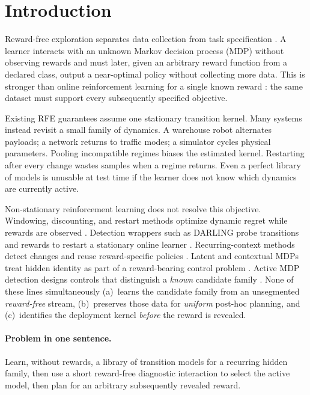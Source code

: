 \documentclass[11pt]{article}
\begin{document}
\section{Introduction}
\label{sec:intro}

Reward-free exploration separates data collection from task specification
\citep{jin2020rewardfree,kaufmann2021adaptive,zhang2021nearly,menard2021fast}.
A learner interacts with an unknown Markov decision process (MDP) without
observing rewards and must later, given an arbitrary reward function from a
declared class, output a near-optimal policy without collecting more data.
This is stronger than online reinforcement learning for a single known reward
\citep{sutton2018reinforcement,jaksch2010near}: the same dataset must support
every subsequently specified objective.

Existing RFE guarantees assume one stationary transition kernel. Many systems
instead revisit a small family of dynamics. A warehouse robot alternates
payloads; a network returns to traffic modes; a simulator cycles physical
parameters. Pooling incompatible regimes biases the estimated kernel.
Restarting after every change wastes samples when a regime returns. Even a
perfect library of models is unusable at test time if the learner does not
know which dynamics are currently active.

Non-stationary reinforcement learning does not resolve this objective.
Windowing, discounting, and restart methods optimize dynamic regret while
rewards are observed \citep{cheung2020nonstationary,wei2021master}. Detection
wrappers such as DARLING probe transitions and rewards to restart a stationary
online learner \citep{gerogiannis2026darling}. Recurring-context methods detect
changes and reuse reward-specific policies \citep{alegre2021minimum}. Latent
and contextual MDPs treat hidden identity as part of a reward-bearing control
problem \citep{hallak2015contextual,kwon2021latent}. Active MDP detection
designs controls that distinguish a \emph{known} candidate family
\citep{duan2021detection}. None of these lines simultaneously (a)~learns the
candidate family from an unsegmented \emph{reward-free} stream,
(b)~preserves those data for \emph{uniform} post-hoc planning, and
(c)~identifies the deployment kernel \emph{before} the reward is revealed.

\paragraph{Problem in one sentence.}
Learn, without rewards, a library of transition models for a recurring hidden
family, then use a short reward-free diagnostic interaction to select the
active model, then plan for an arbitrary subsequently revealed reward.
\end{document}
